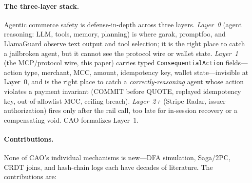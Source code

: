 \documentclass{article}
\begin{document}
\paragraph{The three-layer stack.} Agentic commerce safety is defense-in-depth across three
layers. \emph{Layer~0} (agent reasoning: LLM, tools, memory, planning) is where garak,
promptfoo, and LlamaGuard observe text output and tool selection; it is the right place to
catch a jailbroken agent, but it cannot see the protocol wire or wallet state.
\emph{Layer~1} (the MCP/protocol wire, this paper) carries typed
\texttt{ConsequentialAction} fields---action type, merchant, MCC, amount, idempotency key,
wallet state---invisible at Layer~0, and is the right place to catch a
\emph{correctly-reasoning} agent whose action violates a payment invariant (COMMIT before
QUOTE, replayed idempotency key, out-of-allowlist MCC, ceiling breach). \emph{Layer~2+}
(Stripe Radar, issuer authorization) fires only after the rail call, too late for
in-session recovery or a compensating void. CAO formalizes Layer~1.

\paragraph{Contributions.} None of CAO's individual mechanisms is new---DFA simulation,
Saga/2PC, CRDT joins, and hash-chain logs each have decades of literature. The contributions are:
\end{document}
